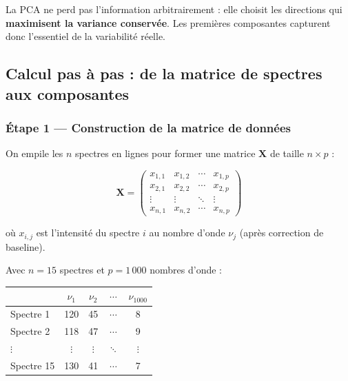 \documentclass[12pt, a4paper]{article}
\newcommand{\X}{\mathbf{X}}
\begin{document}
\begin{attention}
La PCA ne \og perd\fg{} pas l'information arbitrairement : elle choisit les
directions qui \textbf{maximisent la variance conservée}. Les premières
composantes capturent donc l'essentiel de la variabilité réelle.
\end{attention}

\subsection{Calcul pas à pas : de la matrice de spectres aux composantes}

\subsubsection{Étape 1 --- Construction de la matrice de données}

On empile les $n$ spectres en lignes pour former une matrice $\X$ de taille
$n \times p$ :

\[
\X =
\begin{pmatrix}
  x_{1,1} & x_{1,2} & \cdots & x_{1,p} \\
  x_{2,1} & x_{2,2} & \cdots & x_{2,p} \\
  \vdots  & \vdots  & \ddots & \vdots  \\
  x_{n,1} & x_{n,2} & \cdots & x_{n,p}
\end{pmatrix}
\]

où $x_{i,j}$ est l'intensité du spectre $i$ au nombre d'onde $\nu_j$
(après correction de baseline).

\begin{exemple}
Avec $n = 15$ spectres et $p = 1\,000$ nombres d'onde :

\medskip
\begin{center}
\begin{tabular}{lcccc}
\toprule
            & $\nu_1$ & $\nu_2$ & $\cdots$ & $\nu_{1000}$ \\
\midrule
Spectre 1   & 120     & 45      & $\cdots$ & 8   \\
Spectre 2   & 118     & 47      & $\cdots$ & 9   \\
$\vdots$    & $\vdots$& $\vdots$& $\ddots$ & $\vdots$ \\
Spectre 15  & 130     & 41      & $\cdots$ & 7   \\
\bottomrule
\end{tabular}
\end{center}
\end{exemple}
\end{document}

